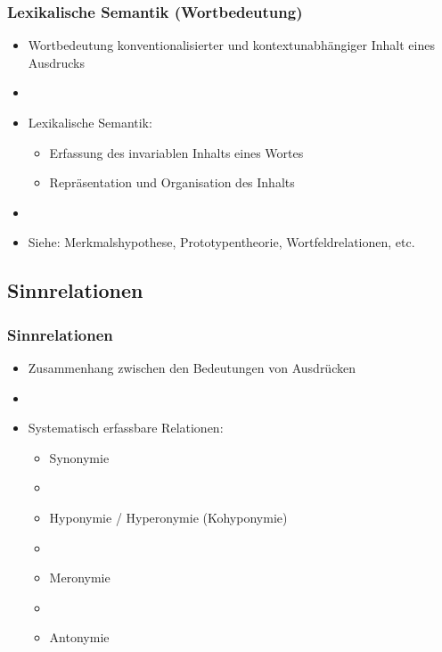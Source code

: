 \begin{frame}
\frametitle{Lexikalische Semantik (Wortbedeutung)}

\begin{itemize}
	\item Wortbedeutung \ras konventionalisierter und kontextunabhängiger Inhalt eines Ausdrucks
	\item[]
	\item Lexikalische Semantik:
	
	\begin{itemize}
		\item Erfassung des invariablen Inhalts eines Wortes
		\item Repräsentation und Organisation des Inhalts
	\end{itemize}
	
	\item[]
	\item Siehe: Merkmalshypothese, Prototypentheorie, Wortfeldrelationen, etc.
\end{itemize}


\end{frame}


%
\subsection{Sinnrelationen}
%

\begin{frame}
\frametitle{Sinnrelationen}

\begin{itemize}
	\item Zusammenhang zwischen den Bedeutungen von Ausdrücken
	\item[]
	\item Systematisch erfassbare Relationen:
	
\vspace{5mm}
	
	\begin{itemize}
		\item Synonymie
		\item[]
		\item Hyponymie / Hyperonymie (Kohyponymie)
		\item[]		
		\item Meronymie
		\item[]
 		\item Antonymie
	\end{itemize}
	
\end{itemize}

\end{frame}


